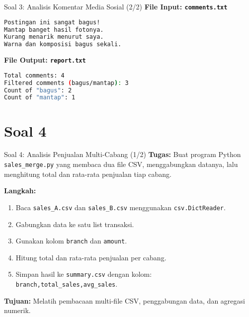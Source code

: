 \documentclass[aspectratio=169, table]{beamer}
\begin{document}
\begin{frame}[fragile]{Soal 3: Analisis Komentar Media Sosial (2/2)}
\vspace{15pt}
\textbf{File Input: \texttt{comments.txt}}
\begin{lstlisting}[language=bash,basicstyle=\ttfamily\small]
Postingan ini sangat bagus!
Mantap banget hasil fotonya.
Kurang menarik menurut saya.
Warna dan komposisi bagus sekali.
\end{lstlisting}

\textbf{File Output: \texttt{report.txt}}
\begin{lstlisting}[language=bash,basicstyle=\ttfamily\small]
Total comments: 4
Filtered comments (bagus/mantap): 3
Count of "bagus": 2
Count of "mantap": 1
\end{lstlisting}
\end{frame}

\section{Soal 4}
\begin{frame}[fragile]{Soal 4: Analisis Penjualan Multi-Cabang (1/2)}
\vspace{10pt}
\textbf{Tugas:}  
Buat program Python \texttt{sales\_merge.py} yang membaca dua file CSV, menggabungkan datanya, lalu menghitung total dan rata-rata penjualan tiap cabang.

\textbf{Langkah:}
\begin{enumerate}
  \item Baca \texttt{sales\_A.csv} dan \texttt{sales\_B.csv} menggunakan \texttt{csv.DictReader}.
  \item Gabungkan data ke satu list transaksi.
  \item Gunakan kolom \texttt{branch} dan \texttt{amount}.
  \item Hitung total dan rata-rata penjualan per cabang.
  \item Simpan hasil ke \texttt{summary.csv} dengan kolom:  
        \texttt{branch,total\_sales,avg\_sales}.
\end{enumerate}
\textbf{Tujuan:}  
Melatih pembacaan multi-file CSV, penggabungan data, dan agregasi numerik.
\end{frame}
\end{document}

